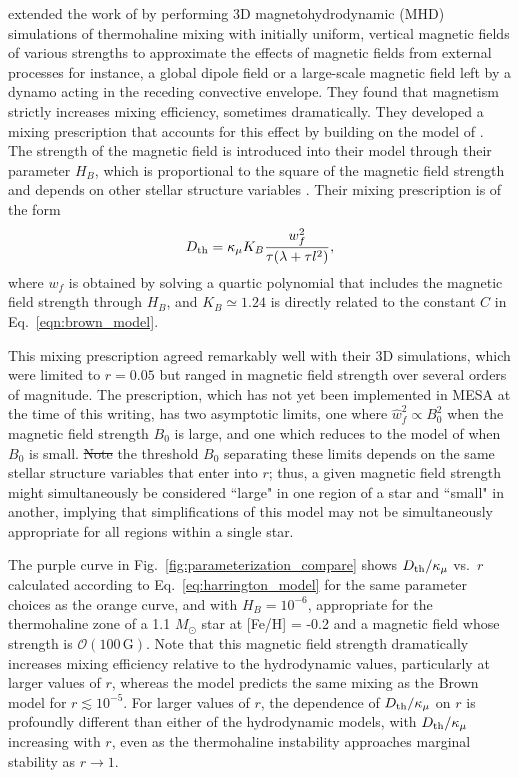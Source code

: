 \citet{harrington} extended the work of \citet{brown_etal_2013} by performing 3D magnetohydrodynamic (MHD) simulations of thermohaline mixing with initially uniform, vertical magnetic fields of various strengths to approximate the effects of magnetic fields from external processes  for instance, a global dipole field or a large-scale magnetic field left  by a dynamo acting in the receding convective envelope. 
They found that magnetism strictly increases mixing efficiency, sometimes dramatically.
They developed a mixing prescription that accounts for this effect by building on the model of \citet{brown_etal_2013}.
The strength of the magnetic field is introduced into their model through their parameter $H_B$, which is proportional to the square of the magnetic field strength and depends on other stellar structure variables \citep[see Eq.~19 of][]{harrington}.
Their mixing prescription is of the form
\begin{equation} \label{eq:harrington_model}
    \Dth = \kappa_{\mu}K_B\frac{w_f^2}{\tau (\lambda + \tau l^2)},
\end{equation}
where $w_f$ is obtained by solving a quartic polynomial that includes the magnetic field strength through $H_B$, and $K_B \simeq 1.24$ is directly related to the constant $C$ in Eq.~\eqref{eqn:brown_model}.

This mixing prescription agreed remarkably well with their 3D simulations, which were limited to $r = 0.05$ but ranged in magnetic field strength over several orders of magnitude.
The prescription, which has not yet been implemented in MESA at the time of this writing, has two asymptotic limits, one where $\hat{w}_f^2 \propto B_0^2$ when the magnetic field strength $B_0$ is large, and one which reduces to the model of \citet{brown_etal_2013} when $B_0$ is small. 
 \sout{Note} the threshold $B_0$ separating these limits depends on the same stellar structure variables that enter into $r$; thus, a given magnetic field strength might simultaneously be considered ``large" in one region of a star and ``small" in another, implying that simplifications of this model may not be simultaneously appropriate for all regions within a single star.

The purple curve in Fig.~\ref{fig:parameterization_compare} shows $D_\mathrm{th}/\kappa_\mu$ vs.~$r$ calculated according to Eq.~\eqref{eq:harrington_model} for the same parameter choices as the orange curve, and with $H_B = 10^{-6}$, appropriate for the thermohaline zone of a 1.1 $M_\odot$ star at [Fe/H] = -0.2 and a magnetic field whose strength is $\mathcal{O}(100 \,\mathrm{G})$. 
Note that this magnetic field strength dramatically increases mixing efficiency relative to the hydrodynamic values, particularly at larger values of $r$, whereas the model predicts the same mixing as the Brown model for $r \lesssim 10^{-5}$. 
For larger values of $r$, the dependence of $D_\mathrm{th}/\kappa_\mu$ on $r$ is profoundly different than either of the hydrodynamic models, with $D_\mathrm{th}/\kappa_\mu$ increasing with $r$, even as the thermohaline instability approaches marginal stability as $r \to 1$.

